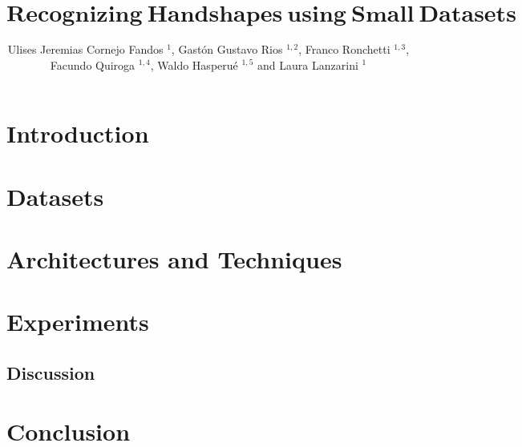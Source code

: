 \documentclass{fcs}
\title{$\bm{Recognizing~ Handshapes~ using~ Small~ Datasets}$}
\author{Ulises Jeremias Cornejo Fandos $^{1}$, Gastón Gustavo Rios $^{1,2}$, Franco Ronchetti $^{1,3}$, Facundo Quiroga \xff $^{1,4}$, Waldo Hasperué $^{1,5}$ and Laura Lanzarini $^{1}$}
\begin{document}
\maketitle
\setcounter{page}{1}



\section{Introduction}


\section{Datasets}
\label{sec:datasets}


\section{Architectures and Techniques}
\label{sec:models}


\section{Experiments}
\label{sec:experiments}


\subsection{Discussion}
\label{sec:results}


\section{Conclusion}
\label{sec:conclusion}




\end{document}
